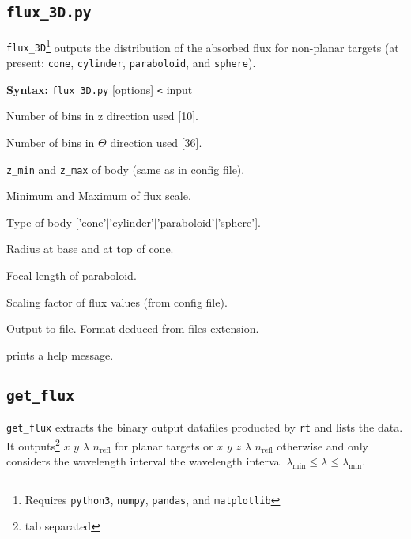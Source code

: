 \documentclass[10pt,a4paper,titlepage]{article}
\begin{document}
\subsection{{\tt flux\_3D.py}}
{\tt flux\_3D}\footnote{Requires {\tt python3}, {\tt numpy}, {\tt pandas}, and {\tt matplotlib}} outputs the distribution of the absorbed flux for non-planar targets (at present: {\tt cone}, {\tt cylinder}, {\tt paraboloid}, and {\tt sphere}).

{\bf Syntax:} {\tt flux\_3D.py} [options] {\tt <} input
\vspace{1em}
\begin{list}{}
{\setlength{\leftmargin}{3.5cm}
\setlength{\labelwidth}{3.2cm}
\setlength{\labelsep}{0.25cm}
\setlength{\rightmargin}{0.5cm}}

\item[{\tt [--nZ|-z]}] Number of bins in z direction used [10].
\item[{\tt [--nTheta|-a]}] Number of bins in $\Theta$ direction used [36].
\item[{\tt [--Zlimits|-Z]}] {\tt z\_min} and {\tt z\_max} of body (same as in config file).
\item[{\tt [--FLuxlimits|-F]}] Minimum and Maximum of flux scale.
\item[{\tt [--type|-t]}] Type of body ['cone'$\mid$'cylinder'$\mid$'paraboloid'$\mid$'sphere'].
\item[{\tt [--rlimits|-r]}] Radius at base and at top of cone.
\item[{\tt [--foc|-f}] Focal length of paraboloid.
\item[{\tt [--Pfactor|-P]}] Scaling factor of flux values (from config file).
\item[{\tt [--output|-o]}] Output to file. Format deduced from files extension.
\item[{\tt [--help|-h]}] prints a help message.

\end{list}

\subsection{{\tt get\_flux}}
{\tt get\_flux} extracts the binary output datafiles producted by {\tt rt} and lists the data. It outputs\footnote{tab separated} $x$ $y$ $\lambda$ $n_{\mathrm{refl}}$ for planar targets or $x$ $y$ $z$ $\lambda$ $n_{\mathrm{refl}}$ otherwise and only considers the wavelength interval the wavelength interval $ \lambda_\mathrm{min} \le \lambda \le \lambda_\mathrm{min}$.
\end{document}
